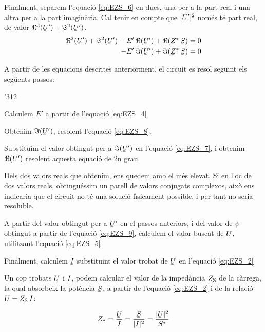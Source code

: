 Finalment, separem l'equaci\'{o} \eqref{eq:EZS_6} en dues, una per a la part real i una altra per a la part imagin\`{a}ria. Cal tenir en compte que $|\cmplx{U}'|^2$ nom\'{e}s t\'{e} part real, de valor $\Re^2(\cmplx{U}') + \Im^2(\cmplx{U}')$.
\begin{align}
   \Re^2(\cmplx{U}') + \Im^2(\cmplx{U}') - E' \, \Re(\cmplx{U}') + \Re(\cmplx{Z}^* \, \cmplx{S}) &= 0 \label{eq:EZS_7} \\
   - E' \, \Im(\cmplx{U}') + \Im(\cmplx{Z}^* \, \cmplx{S}) &= 0 \label{eq:EZS_8}
\end{align}

A partir de les equacions descrites anteriorment, el circuit es resol seguint els seg\"{u}ents passos:
\begin{dingautolist}{'312}
   \item Calculem $E'$ a partir de l'equaci\'{o} \eqref{eq:EZS_4}
   \item Obtenim $\Im(\cmplx{U}')$, resolent l'equaci\'{o} \eqref{eq:EZS_8}.
   \item Substitu\"{\i}m el valor obtingut per a $\Im(\cmplx{U}')$ en l'equaci\'{o} \eqref{eq:EZS_7}, i obtenim $\Re(\cmplx{U}')$ resolent aquesta equaci\'{o} de 2n grau.
   \item Dels dos valors reals que obtenim, ens quedem amb el m\'{e}s elevat. Si en lloc de dos valors reals, obtingu\'{e}ssim un parell de valors conjugats complexos, aix\`{o} ens indicaria que el circuit no t\'{e} una soluci\'{o} f\'{\i}sicament possible, i per tant no seria resoluble.
   \item A partir del valor  obtingut per a $\cmplx{U}'$ en el passos anteriors, i del valor de $\psi$ obtingut a partir de l'equaci\'{o} \eqref{eq:EZS_9}, calculem el valor buscat de $\cmplx{U}$, utilitzant l'equaci\'{o} \eqref{eq:EZS_5}
   \item Finalment, calculem $\cmplx{I}$ substituint el valor trobat de $\cmplx{U}$ en l'equaci\'{o} \eqref{eq:EZS_2}
\end{dingautolist}

Un cop trobats $\cmplx{U}$ i $\cmplx{I}$, podem calcular el valor de
la imped\`{a}ncia  $\cmplx{Z}\ped{S}$ de la c\`{a}rrega, la qual absorbeix
la pot\`{e}ncia $\cmplx{S}$, a partir de l'equaci\'{o} \eqref{eq:EZS_2} i de
la relaci\'{o} $\cmplx{U} = \cmplx{Z}\ped{S} \,\cmplx{I}$:

\begin{equation}
   \cmplx{Z}\ped{S} = \frac{\cmplx{U}}{\cmplx{I}} =
   \frac{\cmplx{S}}{|\cmplx{I}|^2} =
   \frac{|\cmplx{U}|^2}{\cmplx{S}^*} \label{eq:EZS 10}
\end{equation}

